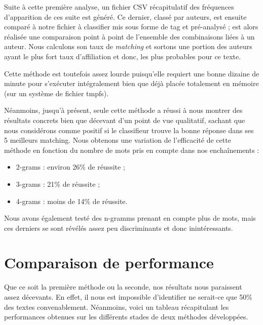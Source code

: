 \documentclass[a4paper,12pt]{report}
\begin{document}
Suite à cette première analyse, un fichier CSV récapitulatif des fréquences d'apparition de ces suite est généré. Ce dernier, classé par auteurs, est ensuite comparé à notre fichier à classifier mis sous forme de tag et pré-analysé ; est alors réalisée une comparaison point à point de l'ensemble des combinaisons liées à un auteur. Nous calculons son taux de \textit{matching} et sortons une portion des auteurs ayant le plus fort taux d'affiliation et donc, les plus probables pour ce texte. 

Cette méthode est toutefois assez lourde puisqu'elle requiert une bonne dizaine de minute pour s'exécuter intégralement bien que déjà placée totalement en mémoire (sur un système de fichier tmpfs). 

Néanmoins, jusqu'à présent, seule cette méthode a réussi à nous montrer des résultats concrets bien que décevant d'un point de vue qualitatif, sachant que nous considérons comme positif si le classifieur trouve la bonne réponse dans ses 5 meilleurs matching. Nous obtenons une variation de l'efficacité de cette méthode en fonction du nombre de mots pris en compte dans nos enchaînements :

\begin{itemize}
\item{2-grams : environ 26\% de réussite ;}
\item{3-grams : 21\% de réussite ;}
\item{4-grams : moins de 14\% de réussite.}
\end{itemize}

Nous avons également testé des n-gramms prenant en compte plus de mots, mais ces derniers se sont révélés assez peu discriminants et donc inintéressants.



\section{Comparaison de performance}

Que ce soit la première méthode ou la seconde, nos résultats nous paraissent assez décevants. En effet, il nous est impossible d'identifier ne serait-ce que 50\% des textes convenablement. Néanmoins, voici un tableau récapitulant les performances obtenues sur les différents stades de deux méthodes développées.
\end{document}
